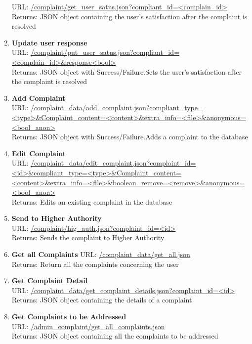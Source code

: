 \documentclass{article}
\begin{document}
\begin{enumerate}
						URL: \url{/complaint/get_user_satus.json?compliant_id=<complain_id>}\\
						Returns: JSON object containing the user's satisfaction after the complaint is resolved
					\item \textbf{Update user response} \\
						URL: \url{/complaint/put_user_satus.json?compliant_id=<complain_id>&response<bool>}\\
						Returns: JSON object with Success/Failure.Sets the user's satisfaction after the complaint is resolved
					\item \textbf{Add Complaint} \\
						URL: \url{/complaint_data/add_complaint.json?compliant_type=<type>&Complaint_content=<content>&extra_info=<file>&anonymous=<bool_anon>}\\
						Returns: JSON object with Success/Failure.Adds a complaint to the database
					\item \textbf{Edit Complaint} \\
						URL: \url{/complaint_data/edit_complaint.json?complaint_id=<id>&compliant_type=<type>&Complaint_content=<content>&extra_info=<file>&boolean_remove=<remove>&anonymous=<bool_anon>}\\
						Returns: Edits an existing complaint in the database
					\item \textbf{Send to Higher Authority} \\
						URL: \url{/complaint/hig_auth.json?complaint_id=<id>}\\
						Returns: Sends the complaint to Higher Authority
					\item \textbf{Get all Complaints}
						URL: \url{/complaint_data/get_all.json}\\
						Returns: Return all the complaints concerning the user
					\item \textbf{Get Complaint Detail}	\\					
						URL: \url{/complaint_data/get_complaint_details.json?complaint_id=<id>}\\
						Returns: JSON object containing the details of a complaint 
					\item \textbf{Get Complaints to be Addressed} \\	
						URL: \url{/admin_complaint/get_all_complaints.json}\\
						Returns: JSON object containing all the complaints to be addressed

\end{enumerate}
\end{document}

